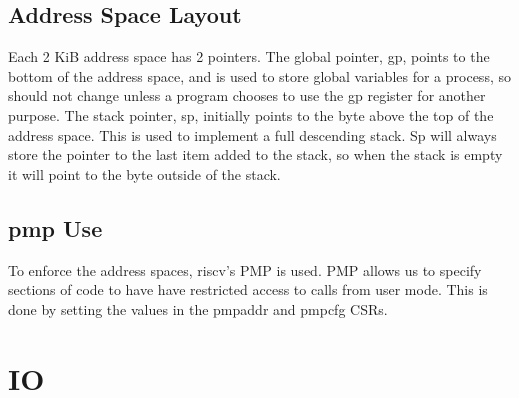 \subsection{Address Space Layout}
Each 2 KiB address space has 2 pointers. The global pointer, gp, points to the bottom of the address space, and is used to store global variables for a process, so should not change unless a program chooses to use the gp register for another purpose. The stack pointer, sp, initially points to the byte above the top of the address space. This is used to implement a full descending stack. Sp will always store the pointer to the last item added to the stack, so when the stack is empty it will point to the byte outside of the stack.
\subsection{\ac{pmp} Use}
To enforce the address spaces, \gls{riscv}'s PMP is used. PMP allows us to specify sections of code to have have restricted access to calls from user mode. This is done by setting the values in the pmpaddr and pmpcfg CSRs.
\section{IO}
